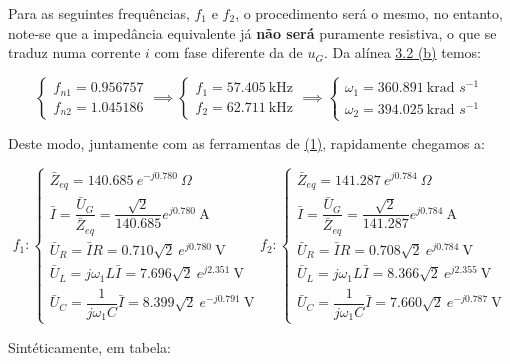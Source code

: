 Para as seguintes frequências, $f_1$ e $f_2$, o procedimento será o mesmo, no entanto, note-se que a impedância equivalente já \textbf{não será} puramente resistiva, o que se traduz numa corrente $i$ com fase diferente da de $u_G$. Da alínea \hyperref[subsubsec_b]{\underline{3.2} (b)} temos:

$$
\begin{cases}
    f_{n1} = 0.956757\\
    f_{n2} = 1.045186
\end{cases}
\implies
\begin{cases}
    f_1 = 57.405\ \text{kHz}\\
    f_2 = 62.711\ \text{kHz}
\end{cases}
\implies
\begin{cases}
    \omega_1 = 360.891\ \text{krad\ $s^{-1}$}\\
    \omega_2 = 394.025\ \text{krad\ $s^{-1}$}
\end{cases}
$$

\clearpage
Deste modo, juntamente com as ferramentas de \hyperref[eq1]{(1)}, rapidamente chegamos a:

$$
f_1 :
\begin{cases}
    \bar{Z}_{eq} = 140.685\ e^{-j 0.780}\ \Omega\\
    \bar{I} = \dfrac{\bar{U}_G}{\bar{Z}_{eq}} =  \dfrac{\sqrt{2}}{140.685}e^{j0.780}\ \text{A}\\
    \bar{U}_R = \bar{I}R = 0.710\sqrt{2}\ e^{j0.780}\ \text{V}\\
    \bar{U}_L = j\omega_1 L \bar{I} = 7.696\sqrt{2}\ e^{j2.351}\ \text{V}\\
    \bar{U}_C = \dfrac{1}{j\omega_1 C}\bar{I} = 8.399\sqrt{2}\ e^{-j0.791}\ \text{V}
\end{cases}
f_2 :
\begin{cases}
    \bar{Z}_{eq} = 141.287\ e^{j0.784}\ \Omega\\    
    \bar{I} = \dfrac{\bar{U}_G}{\bar{Z}_{eq}} = \dfrac{\sqrt{2}}{141.287}e^{j0.784}\ \text{A}\\
    \bar{U}_R = \bar{I}R = 0.708\sqrt{2}\ e^{j0.784}\ \text{V}\\
    \bar{U}_L = j\omega_1 L \bar{I} = 8.366\sqrt{2}\ e^{j2.355}\ \text{V}\\
    \bar{U}_C = \dfrac{1}{j\omega_1 C}\bar{I} = 7.660\sqrt{2}\ e^{-j0.787}\ \text{V}
\end{cases}
$$

Sintéticamente, em tabela:


